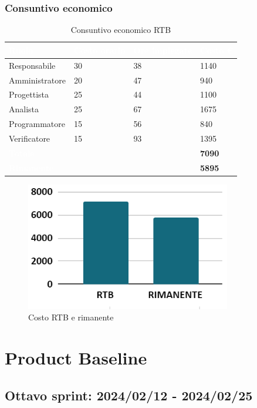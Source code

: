 \newpage
\subsubsection{Consuntivo economico}
{
\setlength{\tabcolsep}{10pt}
\renewcommand{\arraystretch}{1.5}
\begin{table}[h]
    \centering
    \begin{tabularx}{\textwidth}{| l | l | l | X |}
        \hline
        \rowcolor{headerrow} \textbf{\textcolor{white}{Ruolo}} & \textbf{\textcolor{white}{Costo orario}} & \textbf{\textcolor{white}{Ore impiegate}} & \textbf{\textcolor{white}{Costo €}} \\
        \hline
        Responsabile & 30 & 38 & 1140\\
        \hline
        Amministratore & 20 & 47 & 940\\
        \hline
        Progettista & 25 & 44 & 1100\\
        \hline
        Analista & 25 & 67 & 1675\\
        \hline
        Programmatore & 15 & 56 & 840\\
        \hline
        Verificatore & 15 & 93 & 1395\\
        \hline
        \cellcolor{headerrow} \textbf{\textcolor{white}{Totale}} &  &  & \textbf{7090}\\
        \hline
        \cellcolor{headerrow} \textbf{\textcolor{white}{Rimanente}} &  &  & \textbf{5895}\\
        \hline
    \end{tabularx}
    \caption{Consuntivo economico RTB}
    \label{tab:consuntivocostiRTB}
\end{table}
}

\begin{figure}[h!]
    \centering
    \includegraphics[width=0.8\textwidth]{costiTotaliRTB.png}
    \caption{Costo RTB e rimanente}
    \label{fig:consuntivocostoRTB}
\end{figure}

\newpage

\section{Product Baseline}
\subsection{Ottavo sprint: 2024/02/12 - 2024/02/25}